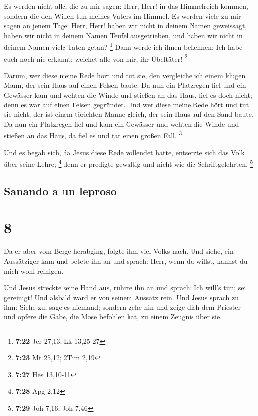  Es werden nicht alle, die zu mir sagen: Herr, Herr! in
das Himmelreich kommen, sondern die den Willen tun meines Vaters im
Himmel.  Es werden viele zu mir sagen an jenem Tage:
Herr, Herr! haben wir nicht in deinem Namen geweissagt, haben wir nicht
in deinem Namen Teufel ausgetrieben, und haben wir nicht in deinem Namen
viele Taten getan? \footnote{\textbf{7:22} Jer 27,13; Lk 13,25-27}
 Dann werde ich ihnen bekennen: Ich habe euch noch nie
erkannt; weichet alle von mir, ihr Übeltäter! \footnote{\textbf{7:23} Mt
  25,12; 2Tim 2,19}

 Darum, wer diese meine Rede hört und tut sie, den
vergleiche ich einem klugen Mann, der sein Haus auf einen Felsen baute.
 Da nun ein Platzregen fiel und ein Gewässer kam und
wehten die Winde und stießen an das Haus, fiel es doch nicht; denn es
war auf einen Felsen gegründet.  Und wer diese meine Rede
hört und tut sie nicht, der ist einem törichten Manne gleich, der sein
Haus auf den Sand baute.  Da nun ein Platzregen fiel und
kam ein Gewässer und wehten die Winde und stießen an das Haus, da fiel
es und tat einen großen Fall. \footnote{\textbf{7:27} Hes 13,10-11}

 Und es begab sich, da Jesus diese Rede vollendet hatte,
entsetzte sich das Volk über seine Lehre; \footnote{\textbf{7:28} Apg
  2,12}  denn er predigte gewaltig und nicht wie die
Schriftgelehrten. \footnote{\textbf{7:29} Joh 7,16; Joh 7,46}

\hypertarget{sanando-a-un-leproso}{%
\subsection{Sanando a un leproso}\label{sanando-a-un-leproso}}

\hypertarget{section-7}{%
\section{8}\label{section-7}}

 Da er aber vom Berge herabging, folgte ihm viel Volks
nach.  Und siehe, ein Aussätziger kam und betete ihn an
und sprach: Herr, wenn du willst, kannst du mich wohl reinigen.

 Und Jesus streckte seine Hand aus, rührte ihn an und
sprach: Ich will's tun; sei gereinigt! Und alsbald ward er von seinem
Aussatz rein.  Und Jesus sprach zu ihm: Siehe zu, sage es
niemand; sondern gehe hin und zeige dich dem Priester und opfere die
Gabe, die Mose befohlen hat, zu einem Zeugnis über sie.

